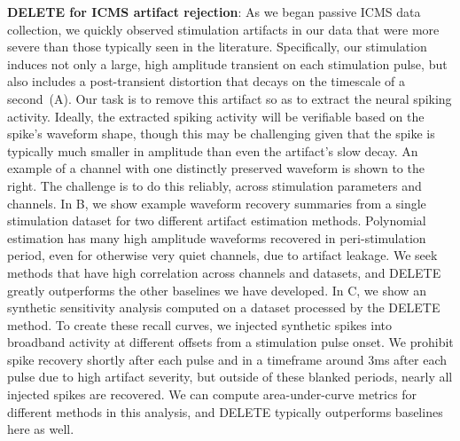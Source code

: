 \documentclass[12pt,oneside]{report}
\begin{document}
\textbf{DELETE for ICMS artifact rejection}: As we began passive ICMS data collection, we quickly observed stimulation artifacts in our data that were more severe than those typically seen in the literature. Specifically, our stimulation induces not only a large, high amplitude transient on each stimulation pulse, but also includes a post-transient distortion that decays on the timescale of a second~(A). Our task is to remove this artifact so as to extract the neural spiking activity. Ideally, the extracted spiking activity will be verifiable based on the spike’s waveform shape, though this may be challenging given that the spike is typically much smaller in amplitude than even the artifact’s slow decay. An example of a channel with one distinctly preserved waveform is shown to the right. The challenge is to do this reliably, across stimulation parameters and channels. In B, we show example waveform recovery summaries from a single stimulation dataset for two different artifact estimation methods. Polynomial estimation has many high amplitude waveforms recovered in peri-stimulation period, even for otherwise very quiet channels, due to artifact leakage. We seek methods that have high correlation across channels and datasets, and DELETE greatly outperforms the other baselines we have developed. In C, we show an synthetic sensitivity analysis computed on a dataset processed by the DELETE method. To create these recall curves, we injected synthetic spikes into broadband activity at different offsets from a stimulation pulse onset. We prohibit spike recovery shortly after each pulse and in a timeframe around 3ms after each pulse due to high artifact severity, but outside of these blanked periods, nearly all injected spikes are recovered. We can compute area-under-curve metrics for different methods in this analysis, and DELETE typically outperforms baselines here as well.
\end{document}
